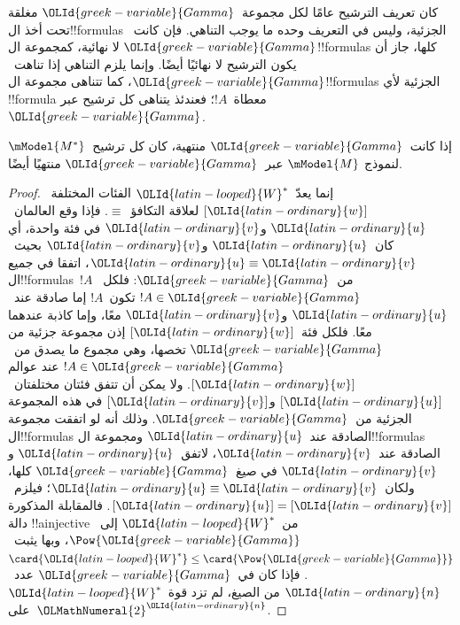 \documentclass[../../../include/open-logic-section]{subfiles}
\begin{document}


كان تعريف الترشيح عامًا لكل مجموعة~${\OLId{greek-variable}{Gamma}}$ مغلقة تحت أخذ ال!!{formula}s
الجزئية، وليس في التعريف وحده ما يوجب التناهي. فإن كانت~${\OLId{greek-variable}{Gamma}}$
لا نهائية، كمجموعة ال!!{formula}s كلها، جاز أن يكون الترشيح لا نهائيًا
أيضًا. وإنما يلزم التناهي إذا تناهت~${\OLId{greek-variable}{Gamma}}$، كما تتناهى مجموعة
ال!!{formula}s الجزئية لأي !!{formula} معطاة~$!A$؛ فعندئذ يتناهى كل
ترشيح عبر~${\OLId{greek-variable}{Gamma}}$.

\begin{prop}
  إذا كانت~${\OLId{greek-variable}{Gamma}}$ منتهية، كان كل ترشيح~$\mModel{M^*}$ لنموذج
  $\mModel{M}$ عبر~${\OLId{greek-variable}{Gamma}}$ منتهيًا أيضًا.
\end{prop}

\begin{proof}
  إنما يعدّ~${\OLId{latin-looped}{W}}^*$ الفئات المختلفة~$[{\OLId{latin-ordinary}{w}}]$ لعلاقة التكافؤ~$\equiv$.
  فإذا وقع العالمان~${\OLId{latin-ordinary}{u}}$ و${\OLId{latin-ordinary}{v}}$ في فئة واحدة، أي كان~${\OLId{latin-ordinary}{u}}$ و${\OLId{latin-ordinary}{v}}$
  بحيث~${\OLId{latin-ordinary}{u}} \equiv {\OLId{latin-ordinary}{v}}$، اتفقا في جميع ال!!{formula}s~$!A$ من~${\OLId{greek-variable}{Gamma}}$:
  فلكل~$!A \in {\OLId{greek-variable}{Gamma}}$ تكون~$!A$ إما صادقة عند~${\OLId{latin-ordinary}{u}}$ و${\OLId{latin-ordinary}{v}}$ معًا،
  وإما كاذبة عندهما معًا. فلكل فئة~$[{\OLId{latin-ordinary}{w}}]$ إذن مجموعة جزئية من
  ${\OLId{greek-variable}{Gamma}}$ تخصها، وهي مجموع ما يصدق من~$!A \in {\OLId{greek-variable}{Gamma}}$ عند عوالم
  $[{\OLId{latin-ordinary}{w}}]$. ولا يمكن أن تتفق فئتان مختلفتان~$[{\OLId{latin-ordinary}{u}}]$ و$[{\OLId{latin-ordinary}{v}}]$ في هذه المجموعة
  الجزئية من~${\OLId{greek-variable}{Gamma}}$. وذلك أنه لو اتفقت مجموعة ال!!{formula}s الصادقة
  عند~${\OLId{latin-ordinary}{u}}$ ومجموعة ال!!{formula}s الصادقة عند~${\OLId{latin-ordinary}{v}}$، لاتفق~${\OLId{latin-ordinary}{u}}$ و${\OLId{latin-ordinary}{v}}$
  في صيغ~${\OLId{greek-variable}{Gamma}}$ كلها، ولكان~${\OLId{latin-ordinary}{u}} \equiv {\OLId{latin-ordinary}{v}}$؛ فيلزم~$[{\OLId{latin-ordinary}{u}}]=[{\OLId{latin-ordinary}{v}}]$.
  فالمقابلة المذكورة دالة !!a{injective} من~${\OLId{latin-looped}{W}}^*$ إلى~$\Pow{{\OLId{greek-variable}{Gamma}}}$،
  وبها يثبت~$\card{{\OLId{latin-looped}{W}}^*} \le \card{\Pow{{\OLId{greek-variable}{Gamma}}}}$. فإذا كان في~${\OLId{greek-variable}{Gamma}}$
  عدد~${\OLId{latin-ordinary}{n}}$ من الصيغ، لم تزد قوة~${\OLId{latin-looped}{W}}^*$ على~${\OLMathNumeral{2}}^{\OLId{latin-ordinary}{n}}$.
\end{proof}
\end{document}
